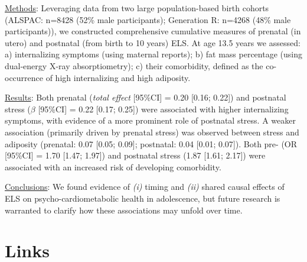 \documentclass[
  letterpaper,
  DIV=11,
  numbers=noendperiod]{scrreport}
\begin{document}
\ul{Methods}: Leveraging data from two large population-based birth
cohorts (ALSPAC: n=8428 (52\% male participants); Generation R: n=4268
(48\% male participants)), we constructed comprehensive cumulative
measures of prenatal (in utero) and postnatal (from birth to 10 years)
ELS. At age 13.5 years we assessed: a) internalizing symptoms (using
maternal reports); b) fat mass percentage (using dual-energy X-ray
absorptiometry); c) their comorbidity, defined as the co-occurrence of
high internalizing and high adiposity.

\ul{Results}: Both prenatal (\emph{total effect} {[}95\%CI{]} = 0.20
{[}0.16; 0.22{]}) and postnatal stress (\(\beta\) {[}95\%CI{]} = 0.22
{[}0.17; 0.25{]}) were associated with higher internalizing symptoms,
with evidence of a more prominent role of postnatal stress. A weaker
association (primarily driven by prenatal stress) was observed between
stress and adiposity (prenatal: 0.07 {[}0.05; 0.09{]}; postnatal: 0.04
{[}0.01; 0.07{]}). Both pre- (OR {[}95\%CI{]} = 1.70 {[}1.47; 1.97{]})
and postnatal stress (1.87 {[}1.61; 2.17{]}) were associated with an
increased risk of developing comorbidity.

\ul{Conclusions}: We found evidence of \emph{(i)} timing and \emph{(ii)}
shared causal effects of ELS on psycho-cardiometabolic health in
adolescence, but future research is warranted to clarify how these
associations may unfold over time.

\newpage

\section*{Links}\label{links}

\end{document}
